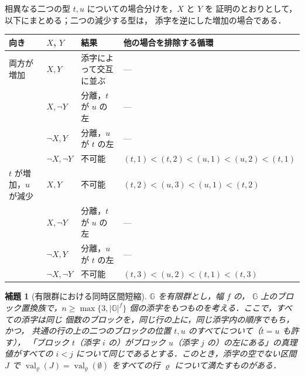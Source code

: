 \documentclass[11pt,a4paper]{ltjsarticle}
\numberwithin{equation}{section}
\theoremstyle{plain}
\newtheorem{lemma}[theorem]{補題}
\theoremstyle{definition}
\theoremstyle{remark}
\theoremstyle{plain}
\begin{document}
相異なる二つの型 $t,u$ についての場合分けを，$X$ と $Y$ を
証明のとおりとして，以下にまとめる；二つの減少する型は，
添字を逆にした増加の場合である．
\begin{center}
\footnotesize
\setlength{\tabcolsep}{4pt}
\renewcommand{\arraystretch}{1.15}
\begin{tabular}{@{}llll@{}}
\hline
向き & $X$, $Y$ & 結果 & 他の場合を排除する循環\\
\hline
両方が増加 & $X,Y$ & 添字によって交互に並ぶ & ---\\
 & $X,\neg Y$ & 分離，$t$ が $u$ の左 & ---\\
 & $\neg X,Y$ & 分離，$u$ が $t$ の左 & ---\\
 & $\neg X,\neg Y$ & 不可能 & $(t,1)<(t,2)<(u,1)<(u,2)<(t,1)$\\
$t$ が増加，$u$ が減少 & $X,Y$ & 不可能 & $(t,2)<(u,3)<(u,1)<(t,2)$\\
 & $X,\neg Y$ & 分離，$t$ が $u$ の左 & ---\\
 & $\neg X,Y$ & 分離，$u$ が $t$ の左 & ---\\
 & $\neg X,\neg Y$ & 不可能 & $(t,3)<(u,2)<(t,1)<(t,3)$\\
\hline
\end{tabular}
\end{center}

\begin{lemma}[有限群における同時区間短縮]
\label{lem:group-interval}
${\mathbb G}$ を有限群とし，幅 $f$ の，
${\mathbb G}$ 上のブロック置換族で，$n\ge\max\{3,|{\mathbb G}|^f\}$ 個の添字をもつものを考える．ここで，すべての添字は同じ
個数のブロックを，同じ行の上に，同じ添字内の順序でもち，かつ，
共通の行の上の二つのブロックの位置 $t,u$ のすべてについて（$t=u$ も許す），
「ブロック $t$（添字 $i$ の）がブロック $u$（添字 $j$ の）の左にある」の真理値がすべての
$i<j$ について同じであるとする．このとき，添字の空でない区間 $J$ で
$\operatorname{val}_\varrho(J)=\operatorname{val}_\varrho(\emptyset)$ をすべての行 $\varrho$ について満たすものがある．
\end{lemma}
\end{document}
